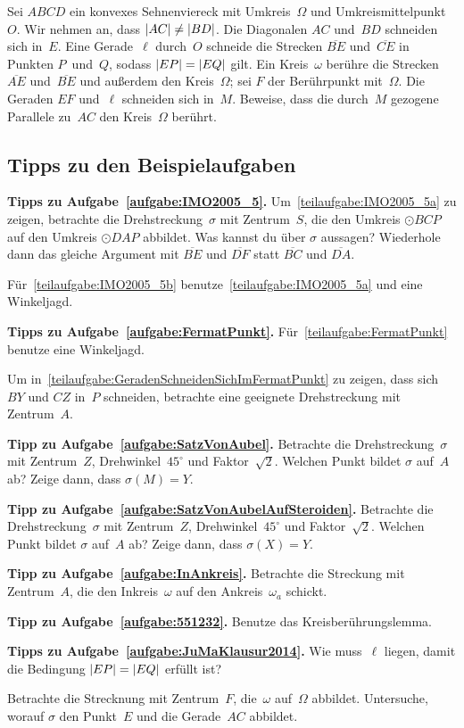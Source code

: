 \begin{aufgabe*}\label{aufgabe:JuMaKlausur2014}
	Sei $ABCD$ ein konvexes Sehnenviereck mit Umkreis~$\Omega$ und Umkreismittelpunkt~$O$. Wir nehmen an, dass $\abs{AC}\neq \abs{BD}$. Die Diagonalen $AC$ und~$BD$ schneiden sich in~$E$. Eine Gerade~$\ell$ durch~$O$ schneide die Strecken $\overline{BE}$ und~$\overline{CE}$ in Punkten $P$~und~$Q$, sodass $\abs{EP}=\abs{EQ}$ gilt. Ein Kreis~$\omega$ berühre die Strecken $\overline{AE}$ und~$\overline{BE}$ und außerdem den Kreis~$\Omega$; sei $F$ der Berührpunkt mit~$\Omega$.
	Die Geraden $EF$ und~$\ell$ schneiden sich in~$M$. Beweise, dass die durch~$M$ gezogene Parallele zu~$AC$ den Kreis~$\Omega$ berührt.
\end{aufgabe*}

\subsection*{Tipps zu den Beispielaufgaben}

\textbf{Tipps zu Aufgabe~\ref{aufgabe:IMO2005_5}.} Um~\ref{teilaufgabe:IMO2005_5a} zu zeigen, betrachte die Drehstreckung~$\sigma$ mit Zentrum~$S$, die den Umkreis $\odot BCP$ auf den Umkreis $\odot DAP$ abbildet. Was kannst du über $\sigma$ aussagen? Wiederhole dann das gleiche Argument mit $\overline{BE}$ und $\overline{DF}$ statt $\overline{BC}$ und $\overline{DA}$.

Für~\ref{teilaufgabe:IMO2005_5b} benutze~\ref{teilaufgabe:IMO2005_5a} und eine Winkeljagd.

\textbf{Tipps zu Aufgabe~\ref{aufgabe:FermatPunkt}.} Für~\ref{teilaufgabe:FermatPunkt} benutze eine Winkeljagd.

Um in~\ref{teilaufgabe:GeradenSchneidenSichImFermatPunkt} zu zeigen, dass sich $BY$ und $CZ$ in~$P$ schneiden, betrachte eine geeignete Drehstreckung mit Zentrum~$A$.

\textbf{Tipp zu Aufgabe~\ref{aufgabe:SatzVonAubel}.} Betrachte die Drehstreckung~$\sigma$ mit Zentrum~$Z$, Drehwinkel~$45^\circ$ und Faktor~$\sqrt{2}$. Welchen Punkt bildet $\sigma$ auf~$A$ ab? Zeige dann, dass $\sigma(M)=Y$.

\textbf{Tipp zu Aufgabe~\ref{aufgabe:SatzVonAubelAufSteroiden}.} Betrachte die Drehstreckung~$\sigma$ mit Zentrum~$Z$, Drehwinkel~$45^\circ$ und Faktor~$\sqrt{2}$. Welchen Punkt bildet $\sigma$ auf~$A$ ab? Zeige dann, dass $\sigma(X)=Y$.

\textbf{Tipp zu Aufgabe~\ref{aufgabe:InAnkreis}.} Betrachte die Streckung mit Zentrum~$A$, die den Inkreis~$\omega$ auf den Ankreis~$\omega_a$ schickt.

\textbf{Tipp zu Aufgabe~\ref{aufgabe:551232}.} Benutze das Kreisberührungslemma.

\textbf{Tipps zu Aufgabe~\ref{aufgabe:JuMaKlausur2014}.} Wie muss~$\ell$ liegen, damit die Bedingung $\abs*{EP}=\abs*{EQ}$ erfüllt ist?

Betrachte die Strecknung mit Zentrum~$F$, die~$\omega$ auf~$\Omega$ abbildet. Untersuche, worauf $\sigma$ den Punkt~$E$ und die Gerade~$AC$ abbildet.